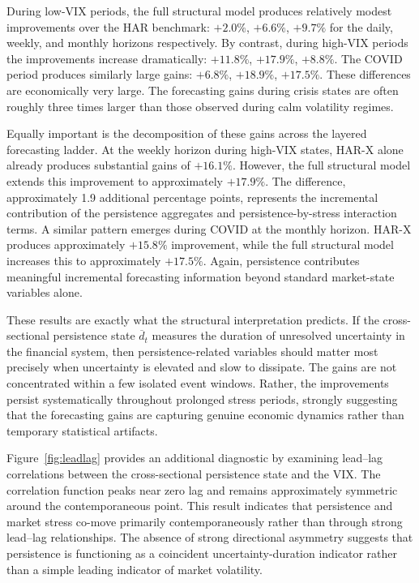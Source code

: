 \documentclass[unnumsec,webpdf,contemporary,large]{oup-authoring-template}%
\theoremstyle{thmstyleone}%
\theoremstyle{thmstyletwo}%
\theoremstyle{thmstylethree}%
\begin{document}
During low-VIX periods, the full structural model produces relatively
modest improvements over the HAR benchmark: $+2.0\%$, $+6.6\%$, $+9.7\%$
for the daily, weekly, and monthly horizons respectively. By contrast,
during high-VIX periods the improvements increase dramatically:
$+11.8\%$, $+17.9\%$, $+8.8\%$. The COVID period produces similarly
large gains: $+6.8\%$, $+18.9\%$, $+17.5\%$. These differences are
economically very large. The forecasting gains during crisis states are
often roughly three times larger than those observed during calm
volatility regimes.



Equally important is the decomposition of these gains across the layered
forecasting ladder. At the weekly horizon during high-VIX states, HAR-X
alone already produces substantial gains of $+16.1\%$. However, the full
structural model extends this improvement to approximately $+17.9\%$. The
difference, approximately 1.9 additional percentage points,
represents the incremental contribution of the persistence aggregates and
persistence-by-stress interaction terms. A similar pattern emerges during
COVID at the monthly horizon. HAR-X produces approximately $+15.8\%$
improvement, while the full structural model increases this to
approximately $+17.5\%$. Again, persistence contributes meaningful
incremental forecasting information beyond standard market-state variables
alone.

These results are exactly what the structural interpretation predicts. If
the cross-sectional persistence state $\overline d_t$ measures the duration
of unresolved uncertainty in the financial system, then persistence-related
variables should matter most precisely when uncertainty is elevated and slow
to dissipate. The gains are not concentrated within a few isolated event
windows. Rather, the improvements persist systematically throughout
prolonged stress periods, strongly suggesting that the forecasting gains
are capturing genuine economic dynamics rather than temporary statistical
artifacts.

Figure~\ref{fig:leadlag} provides an additional diagnostic by examining
lead--lag correlations between the cross-sectional persistence state and
the VIX. The correlation function peaks near zero lag and remains
approximately symmetric around the contemporaneous point. This result
indicates that persistence and market stress co-move primarily
contemporaneously rather than through strong lead--lag relationships. The
absence of strong directional asymmetry suggests that persistence is
functioning as a coincident uncertainty-duration indicator rather than a
simple leading indicator of market volatility.
\end{document}
